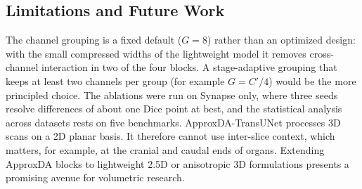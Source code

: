 \subsection{Limitations and Future Work}
The channel grouping is a fixed default ($G=8$) rather than an optimized design: with the small compressed widths of the lightweight model it removes cross-channel interaction in two of the four blocks. A stage-adaptive grouping that keeps at least two channels per group (for example $G = C'/4$) would be the more principled choice. The ablations were run on Synapse only, where three seeds resolve differences of about one Dice point at best, and the statistical analysis across datasets rests on five benchmarks. ApproxDA-TransUNet processes 3D scans on a 2D planar basis. It therefore cannot use inter-slice context, which matters, for example, at the cranial and caudal ends of organs. Extending ApproxDA blocks to lightweight 2.5D or anisotropic 3D formulations presents a promising avenue for volumetric research.

